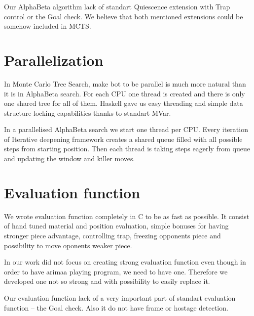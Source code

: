 Our AlphaBeta algorithm lack of standart Quiescence extension with Trap control
or the \ac{Goal check}. We believe that both mentioned extensions could be
somehow included in MCTS.

\section{Parallelization}
In Monte Carlo Tree Search, make bot to be parallel is much more natural than
it is in AlphaBeta search. For each CPU one thread is created and there is only
one shared tree for all of them. Haskell gave us easy threading and simple data
structure locking capabilities thanks to standart MVar.

In a parallelised AlphaBeta search we start one thread per CPU. Every iteration
of Iterative deepening framework creates a shared queue filled with all
possible steps from starting position. Then each thread is taking steps eagerly
from queue and updating the window and killer moves.

\section{Evaluation function}
We wrote evaluation function completely in C to be as fast as possible. It
consist of hand tuned material and position evaluation, simple bonuses for
having stronger piece advantage, controlling trap, freezing opponents piece and
possibility to move oponents weaker piece.

In our work did not focus on creating strong evaluation function even though in
order to have arimaa playing program, we need to have one. Therefore we
developed one not so strong and with possibility to easily replace it.

Our evaluation function lack of a very important part of standart evaluation
function -- the \ac{Goal check}. Also it do not have frame or hostage detection.
